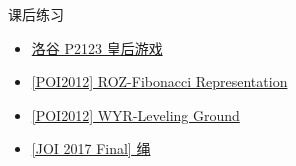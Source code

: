 \begin{frame}[fragile]{课后练习}
	\begin{itemize}
		\item \href{https://www.luogu.com.cn/problem/P2123}{洛谷 P2123 皇后游戏}
		\item \href{https://www.luogu.com.cn/problem/P3539}{[POI2012] ROZ-Fibonacci Representation}
		\item \href{https://www.luogu.com.cn/problem/P3543}{[POI2012] WYR-Leveling Ground}
		\item \href{https://www.luogu.com.cn/problem/P5101}{[JOI 2017 Final] 绳}
	\end{itemize}
\end{frame}